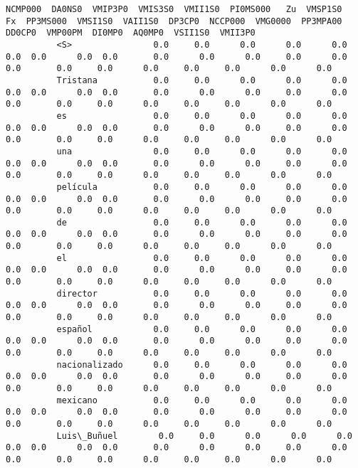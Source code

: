 \documentclass[11pt]{article}
\begin{document}
\begin{Verbatim}[commandchars=\\\{\}]
                         NCMP000  DA0NS0  VMIP3P0  VMIS3S0  VMII1S0  PI0MS000   Zu  VMSP1S0   Fx  PP3MS000  VMSI1S0  VAII1S0  DP3CP0  NCCP000  VMG0000  PP3MPA00  DD0CP0  VMP00PM  DI0MP0  AQ0MP0  VSII1S0  VMII3P0  
          <S>                0.0     0.0      0.0      0.0      0.0       0.0  0.0      0.0  0.0       0.0      0.0      0.0     0.0      0.0      0.0       0.0     0.0      0.0     0.0     0.0      0.0      0.0  
          Tristana           0.0     0.0      0.0      0.0      0.0       0.0  0.0      0.0  0.0       0.0      0.0      0.0     0.0      0.0      0.0       0.0     0.0      0.0     0.0     0.0      0.0      0.0  
          es                 0.0     0.0      0.0      0.0      0.0       0.0  0.0      0.0  0.0       0.0      0.0      0.0     0.0      0.0      0.0       0.0     0.0      0.0     0.0     0.0      0.0      0.0  
          una                0.0     0.0      0.0      0.0      0.0       0.0  0.0      0.0  0.0       0.0      0.0      0.0     0.0      0.0      0.0       0.0     0.0      0.0     0.0     0.0      0.0      0.0  
          película           0.0     0.0      0.0      0.0      0.0       0.0  0.0      0.0  0.0       0.0      0.0      0.0     0.0      0.0      0.0       0.0     0.0      0.0     0.0     0.0      0.0      0.0  
          de                 0.0     0.0      0.0      0.0      0.0       0.0  0.0      0.0  0.0       0.0      0.0      0.0     0.0      0.0      0.0       0.0     0.0      0.0     0.0     0.0      0.0      0.0  
          el                 0.0     0.0      0.0      0.0      0.0       0.0  0.0      0.0  0.0       0.0      0.0      0.0     0.0      0.0      0.0       0.0     0.0      0.0     0.0     0.0      0.0      0.0  
          director           0.0     0.0      0.0      0.0      0.0       0.0  0.0      0.0  0.0       0.0      0.0      0.0     0.0      0.0      0.0       0.0     0.0      0.0     0.0     0.0      0.0      0.0  
          español            0.0     0.0      0.0      0.0      0.0       0.0  0.0      0.0  0.0       0.0      0.0      0.0     0.0      0.0      0.0       0.0     0.0      0.0     0.0     0.0      0.0      0.0  
          nacionalizado      0.0     0.0      0.0      0.0      0.0       0.0  0.0      0.0  0.0       0.0      0.0      0.0     0.0      0.0      0.0       0.0     0.0      0.0     0.0     0.0      0.0      0.0  
          mexicano           0.0     0.0      0.0      0.0      0.0       0.0  0.0      0.0  0.0       0.0      0.0      0.0     0.0      0.0      0.0       0.0     0.0      0.0     0.0     0.0      0.0      0.0  
          Luis\_Buñuel        0.0     0.0      0.0      0.0      0.0       0.0  0.0      0.0  0.0       0.0      0.0      0.0     0.0      0.0      0.0       0.0     0.0      0.0     0.0     0.0      0.0      0.0  

\end{Verbatim}
\end{document}
